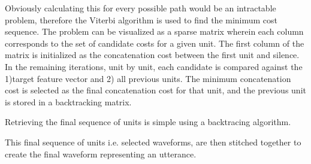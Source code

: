 \documentclass[10pt,a4paper,twocolumn]{article}
\begin{document}
\cite{Hunt:1996:USC:1256383.1256532}\par
Obviously calculating this for every possible path would be an intractable problem, therefore the Viterbi algorithm is used to find the minimum cost sequence. The problem can be visualized as a sparse matrix wherein each column corresponds to the set of candidate costs for a given unit. The first column of the matrix is initialized as the concatenation cost between the first unit and silence. In the remaining iterations, unit by unit, each candidate is compared against the 1)target feature vector and 2) all previous units. The minimum concatenation cost is selected as the final concatenation cost for that unit, and the previous unit is stored in a backtracking matrix.
\begin{algorithm}
\begin{algorithmic}[1]
\EndFor
{}
     \EndFor
\EndFor
{}
\EndFunction
\end{algorithmic}
\end{algorithm}
Retrieving the final sequence of units is simple using a backtracing algorithm.
\begin{algorithm}
\begin{algorithmic}[1]
\EndFor
{}
\EndFunction
\end{algorithmic}
\end{algorithm}
This final sequence of units i.e. selected waveforms, are then stitched together to create the final waveform representing an utterance.
\end{document}
